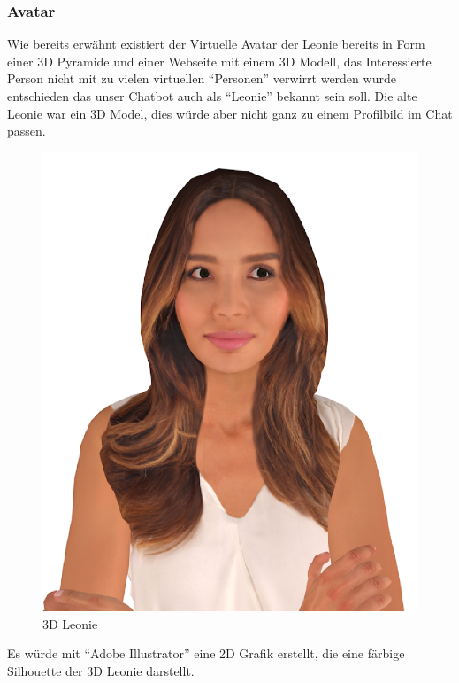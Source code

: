 \subsubsection{Avatar}
Wie bereits erwähnt existiert der Virtuelle Avatar der Leonie bereits in Form einer 3D Pyramide und einer Webseite mit einem 3D Modell, das Interessierte Person nicht mit zu vielen virtuellen ``Personen'' verwirrt werden wurde entschieden das unser Chatbot auch als ``Leonie'' bekannt sein soll.
Die alte Leonie war ein 3D Model, dies würde aber nicht ganz zu einem Profilbild im Chat passen.
\begin{figure}[hbt!]
    \centering
    \includegraphics[scale=0.5]{pics/AvatarLeonie}
    \caption{3D Leonie}
    \label{fig:impl:leonie}
\end{figure}

Es würde mit ``Adobe Illustrator'' eine 2D Grafik erstellt, die eine färbige Silhouette der 3D Leonie darstellt.

